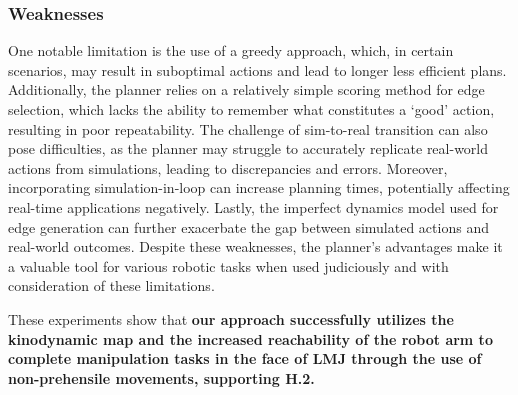 \subsubsection{Weaknesses}
One notable limitation is the use of a greedy approach, which, in certain scenarios, may result in suboptimal actions and lead to longer less efficient plans. Additionally, the planner relies on a relatively simple scoring method for edge selection, which lacks the ability to remember what constitutes a `good' action, resulting in poor repeatability. The challenge of sim-to-real transition can also pose difficulties, as the planner may struggle to accurately replicate real-world actions from simulations, leading to discrepancies and errors. Moreover, incorporating simulation-in-loop can increase planning times, potentially affecting real-time applications negatively. Lastly, the imperfect dynamics model used for edge generation can further exacerbate the gap between simulated actions and real-world outcomes. Despite these weaknesses, the planner's advantages make it a valuable tool for various robotic tasks when used judiciously and with consideration of these limitations.

These experiments show that \textbf{our approach successfully utilizes the kinodynamic map and the increased reachability of the robot arm to complete manipulation tasks in the face of LMJ through the use of non-prehensile movements, supporting H.2.}

